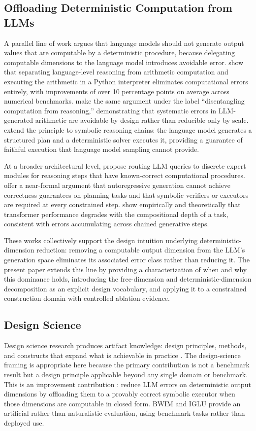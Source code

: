 \documentclass[10pt]{article}
\begin{document}
\subsection{Offloading Deterministic Computation from LLMs}
A parallel line of work argues that language models should not generate
output values that are computable by a deterministic procedure, because
delegating computable dimensions to the language model introduces
avoidable error. \textcite{pal2023} show that separating language-level
reasoning from arithmetic computation and executing the arithmetic in a
Python interpreter eliminates computational errors entirely, with
improvements of over 10 percentage points on average across numerical
benchmarks. \textcite{pot2023} make the same argument under the label
``disentangling computation from reasoning,'' demonstrating that
systematic errors in LLM-generated arithmetic are avoidable by design
rather than reducible only by scale. \textcite{faithfulcot2023} extend
the principle to symbolic reasoning chains: the language model generates
a structured plan and a deterministic solver executes it, providing a
guarantee of faithful execution that language model sampling cannot
provide.

At a broader architectural level, \textcite{mrkl2022} propose routing
LLM queries to discrete expert modules for reasoning steps that have
known-correct computational procedures. \textcite{kambhampati2024} offer
a near-formal argument that autoregressive generation cannot achieve
correctness guarantees on planning tasks and that symbolic verifiers
or executors are required at every constrained step.
\textcite{dziri2023} show empirically and theoretically that transformer
performance degrades with the compositional depth of a task, consistent
with errors accumulating across chained generative steps.

These works collectively support the design intuition underlying
deterministic-dimension reduction: removing a computable output dimension
from the LLM's generation space eliminates its associated error class
rather than reducing it. The present paper extends this line by providing
a characterization of when and why this dominance holds,
introducing the free-dimension and deterministic-dimension decomposition
as an explicit design vocabulary, and applying it to a constrained
construction domain with controlled ablation evidence.

\subsection{Design Science}
Design science research produces artifact knowledge: design principles,
methods, and constructs that expand what is achievable in practice
\parencite{hevner2004}. The design-science framing is appropriate here
because the primary contribution is not a benchmark result but a design
principle applicable beyond any single domain or benchmark. This is an
improvement contribution \parencite{gregorhevner2013}: reduce LLM errors on
deterministic output dimensions by offloading them to a provably correct
symbolic executor when those dimensions are computable in closed form.
BWIM and IGLU provide an artificial rather than naturalistic evaluation,
using benchmark tasks rather than deployed use.
\end{document}
